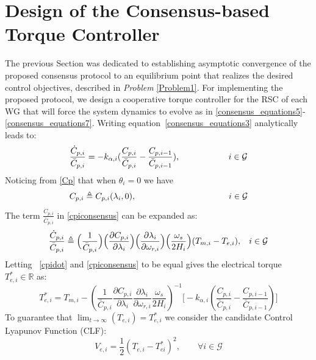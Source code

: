 \documentclass[letterpaper, 10 pt, conference]{ieeeconf}
\begin{document}
\section{Design of the Consensus-based Torque Controller}
The previous Section was dedicated to establishing asymptotic convergence of the proposed consensus protocol to an equilibrium point that realizes the desired control objectives, described in \textit{Problem} \ref{Problem1}.  For implementing the proposed protocol, we  design a cooperative torque controller for the RSC of each WG that will force the system dynamics to evolve as in \eqref{consensus_equations5}-\eqref{consensus_equations7}.  Writing equation~\eqref{consensus_equations3} analytically leads to:
\begin{equation}
\frac{\dot{C}_{p,i}}{\bar{C}_{p,i}}=-k_{\alpha,i}(\frac{C_{p,i}}{\bar{C}_{p,i}}-\frac{C_{p,i-1}}{\bar{C}_{p,i-1}}),\hspace{20mm} i\in\mathcal{G}
\label{cpiconsensus}
\end{equation}
Noticing from \eqref{Cp} that when $\theta_i=0$  we have
\begin{align}
C_{p,i}\triangleq C_{p,i}(\lambda_i,0),\hspace{38mm} i\in\mathcal{G}
\end{align} The term $\frac{\dot{C}_{p,i}}{\bar{C}_{p,i}}$ in \eqref{cpiconsensus} can be expanded as:
\begin{equation}
\frac{\dot{C}_{p,i}}{\bar{C}_{p,i}}\triangleq\Big(\frac{1}{\bar{C}_{p,i}}\Big)\Big(\frac{\partial C_{p,i}}{\partial \lambda_i}\Big)\Big(\frac{\partial \lambda_i}{\partial \omega_{r,i}}\Big)\Big(\frac{\omega_s}{2H_i}\Big)(T_{m,i}-T_{e,i}),\hspace{3mm} i\in\mathcal{G}\label{cpidot}
\end{equation}
Letting  ~\eqref{cpidot} and \eqref{cpiconsensus} to be equal gives the electrical torque $T_{e,i}^{*}\in\mathbb{R}$  as:
\begin{equation}
T_{e,i}^{*}=T_{m,i}-(\frac{1}{\bar{C}_{p,i}}\frac{\partial C_{p,i}}{\partial \lambda_i}\frac{\partial \lambda_i}{\partial \omega_{r,i}}\frac{\omega_s}{2H_i})^{-1}\Big[-k_{\alpha,i}(\frac{C_{p,i}}{\bar{C}_{p,i}}-\frac{C_{p,i-1}}{\bar{C}_{p,i-1}})\Big]
\end{equation}
To guarantee that $\lim_{t\to\infty} (T_{e,i})=T_{e,i}^{*}$ we consider the candidate Control Lyapunov Function (CLF):
\begin{equation}
V_{e,i}=\frac{1}{2}(T_{e,i}-T_{ei}^{*})^2,\qquad  \forall i\in\mathcal{G}
\end{equation}
\end{document}
